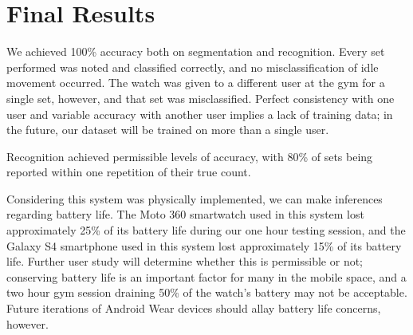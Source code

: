 \section{Final Results}
We achieved 100\% accuracy both on segmentation and recognition. Every set performed was noted and classified correctly, and no misclassification of idle movement occurred. The watch was given to a different user at the gym for a single set, however, and that set was misclassified. Perfect consistency with one user and variable accuracy with another user implies a lack of training data; in the future, our dataset will be trained on more than a single user.

Recognition achieved permissible levels of accuracy, with 80\% of sets being reported within one repetition of their true count. 

Considering this system was physically implemented, we can make inferences regarding battery life. The Moto 360 smartwatch used in this system lost approximately 25\% of its battery life during our one hour testing session, and the Galaxy S4 smartphone used in this system lost approximately 15\% of its battery life. Further user study will determine whether this is permissible or not; conserving battery life is an important factor for many in the mobile space, and a two hour gym session draining 50\% of the watch's battery may not be acceptable. Future iterations of Android Wear devices should allay battery life concerns, however.